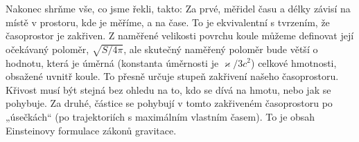     Nakonec shrňme vše, co jsme řekli, takto: Za prvé, měřidel času a délky závisí na místě v 
    prostoru, kde je měříme, a na čase. To je ekvivalentní s tvrzením, že časoprostor je zakřiven. 
    Z naměřené velikosti povrchu koule můžeme definovat její očekávaný poloměr, \(\sqrt{S/4\pi}\), 
    ale skutečný naměřený poloměr bude větší o hodnotu, která je úměrná (konstanta úměrnosti je 
    \(\varkappa/3c^2\)) celkové hmotnosti, obsažené uvnitř koule. To přesně určuje stupeň zakřivení 
    našeho časoprostoru. Křivost musí být stejná bez ohledu na to, kdo se dívá na hmotu, nebo jak 
    se pohybuje. Za druhé, částice se pohybují v tomto zakřiveném časoprostoru po „úsečkách“ (po 
    trajektoriích s maximálním vlastním časem). To je obsah Einsteinovy formulace zákonů gravitace.